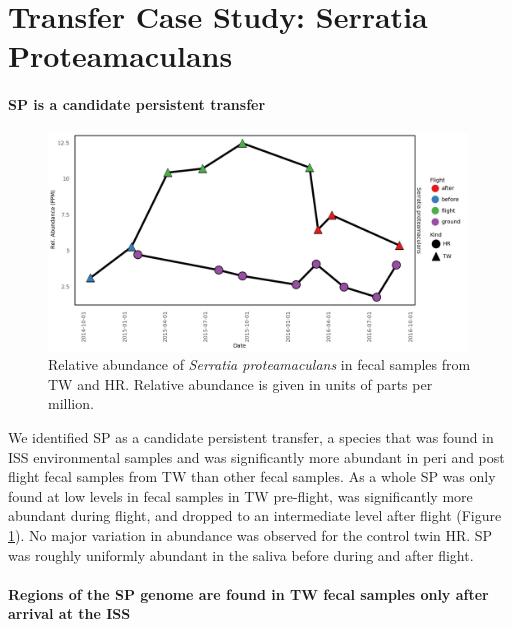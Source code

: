 \section{Transfer Case Study: Serratia Proteamaculans}

\paragraph{SP is a candidate persistent transfer}

\begin{figure}
  \begin{center}
    \includegraphics[width=0.99\textwidth]{figs/sp_abundance.png}
	\caption{\small{
	    Relative abundance of \textit{Serratia proteamaculans} in fecal samples from TW and HR. Relative abundance is given in units of parts per million.
	}}
    \label{fig:abundance}
  \end{center}
\end{figure}

We identified SP as a candidate persistent transfer, a species that was found in ISS environmental samples and was significantly more abundant in peri and post flight fecal samples from TW than other fecal samples. As a whole SP was only found at low levels in fecal samples in TW pre-flight, was significantly more abundant during flight, and dropped to an intermediate level after flight (Figure \ref{fig:abundance}). No major variation in abundance was observed for the control twin HR. SP was roughly uniformly abundant in the saliva before during and after flight.

\paragraph{Regions of the SP genome are found in TW fecal samples only after arrival at the ISS}

